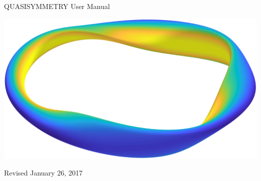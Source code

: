 \begin{center}

\vspace*{1in}

{\Huge QUASISYMMETRY User Manual}

\vspace{2in}

\centerline{\includegraphics[width=6.5in]{m20180404_02_plotQuasisymmetricSolutionForPaperII_a.png}}


\vspace{1.0in}

Revised January 26, 2017

\end{center}

